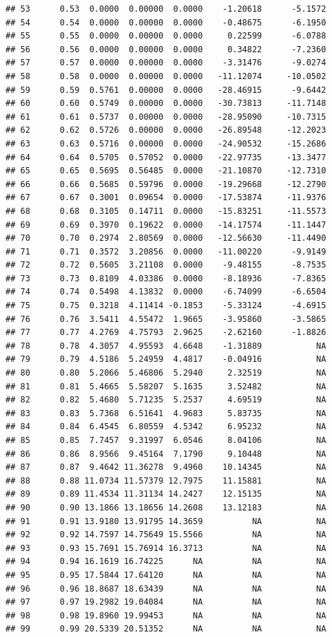 \documentclass{article}\usepackage[]{graphicx}\usepackage[]{color}
\makeatletter
\newenvironment{kframe}{%
 \def\at@end@of@kframe{}%
 \ifinner\ifhmode%
  \def\at@end@of@kframe{\end{minipage}}%
  \begin{minipage}{\columnwidth}%
 \fi\fi%
 \def\FrameCommand##1{\hskip\@totalleftmargin \hskip-\fboxsep
 \colorbox{shadecolor}{##1}\hskip-\fboxsep
     \hskip-\linewidth \hskip-\@totalleftmargin \hskip\columnwidth}%
 \MakeFramed {\advance\hsize-\width
   \@totalleftmargin\z@ \linewidth\hsize
   \@setminipage}}%
 {\par\unskip\endMakeFramed%
 \at@end@of@kframe}
\newenvironment{knitrout}{}{} %
\makeatother
\begin{document}
\begin{knitrout}
\begin{kframe}
\begin{verbatim}
## 53      0.53  0.0000  0.00000  0.0000    -1.20618      -5.1572
## 54      0.54  0.0000  0.00000  0.0000    -0.48675      -6.1950
## 55      0.55  0.0000  0.00000  0.0000     0.22599      -6.0788
## 56      0.56  0.0000  0.00000  0.0000     0.34822      -7.2360
## 57      0.57  0.0000  0.00000  0.0000    -3.31476      -9.0274
## 58      0.58  0.0000  0.00000  0.0000   -11.12074     -10.0502
## 59      0.59  0.5761  0.00000  0.0000   -28.46915      -9.6442
## 60      0.60  0.5749  0.00000  0.0000   -30.73813     -11.7148
## 61      0.61  0.5737  0.00000  0.0000   -28.95090     -10.7315
## 62      0.62  0.5726  0.00000  0.0000   -26.89548     -12.2023
## 63      0.63  0.5716  0.00000  0.0000   -24.90532     -15.2686
## 64      0.64  0.5705  0.57052  0.0000   -22.97735     -13.3477
## 65      0.65  0.5695  0.56485  0.0000   -21.10870     -12.7310
## 66      0.66  0.5685  0.59796  0.0000   -19.29668     -12.2790
## 67      0.67  0.3001  0.09654  0.0000   -17.53874     -11.9376
## 68      0.68  0.3105  0.14711  0.0000   -15.83251     -11.5573
## 69      0.69  0.3970  0.19622  0.0000   -14.17574     -11.1447
## 70      0.70  0.2974  2.80569  0.0000   -12.56630     -11.4490
## 71      0.71  0.3572  3.20856  0.0000   -11.00220      -9.9149
## 72      0.72  0.5605  3.21108  0.0000    -9.48155      -8.7535
## 73      0.73  0.8109  4.03386  0.0000    -8.18936      -7.8365
## 74      0.74  0.5498  4.13832  0.0000    -6.74099      -6.6504
## 75      0.75  0.3218  4.11414 -0.1853    -5.33124      -4.6915
## 76      0.76  3.5411  4.55472  1.9665    -3.95860      -3.5865
## 77      0.77  4.2769  4.75793  2.9625    -2.62160      -1.8826
## 78      0.78  4.3057  4.95593  4.6648    -1.31889           NA
## 79      0.79  4.5186  5.24959  4.4817    -0.04916           NA
## 80      0.80  5.2066  5.46806  5.2940     2.32519           NA
## 81      0.81  5.4665  5.58207  5.1635     3.52482           NA
## 82      0.82  5.4680  5.71235  5.2537     4.69519           NA
## 83      0.83  5.7368  6.51641  4.9683     5.83735           NA
## 84      0.84  6.4545  6.80559  4.5342     6.95232           NA
## 85      0.85  7.7457  9.31997  6.0546     8.04106           NA
## 86      0.86  8.9566  9.45164  7.1790     9.10448           NA
## 87      0.87  9.4642 11.36278  9.4960    10.14345           NA
## 88      0.88 11.0734 11.57379 12.7975    11.15881           NA
## 89      0.89 11.4534 11.31134 14.2427    12.15135           NA
## 90      0.90 13.1866 13.18656 14.2608    13.12183           NA
## 91      0.91 13.9180 13.91795 14.3659          NA           NA
## 92      0.92 14.7597 14.75649 15.5566          NA           NA
## 93      0.93 15.7691 15.76914 16.3713          NA           NA
## 94      0.94 16.1619 16.74225      NA          NA           NA
## 95      0.95 17.5844 17.64120      NA          NA           NA
## 96      0.96 18.8687 18.63439      NA          NA           NA
## 97      0.97 19.2982 19.04084      NA          NA           NA
## 98      0.98 19.8960 19.99453      NA          NA           NA
## 99      0.99 20.5339 20.51352      NA          NA           NA
\end{verbatim}
\end{kframe}
\end{knitrout}
\end{document}
